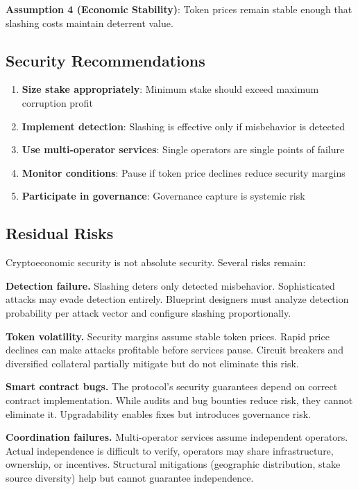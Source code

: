 \documentclass[11pt,a4paper]{article}
\begin{document}
\textbf{Assumption 4 (Economic Stability)}: Token prices remain stable enough that slashing costs maintain deterrent value.

\subsection{Security Recommendations}

\begin{enumerate}[noitemsep]
    \item \textbf{Size stake appropriately}: Minimum stake should exceed maximum corruption profit
    \item \textbf{Implement detection}: Slashing is effective only if misbehavior is detected
    \item \textbf{Use multi-operator services}: Single operators are single points of failure
    \item \textbf{Monitor conditions}: Pause if token price declines reduce security margins
    \item \textbf{Participate in governance}: Governance capture is systemic risk
\end{enumerate}

\subsection{Residual Risks}

Cryptoeconomic security is not absolute security. Several risks remain:

\textbf{Detection failure.} Slashing deters only detected misbehavior. Sophisticated attacks may evade detection entirely. Blueprint designers must analyze detection probability per attack vector and configure slashing proportionally.

\textbf{Token volatility.} Security margins assume stable token prices. Rapid price declines can make attacks profitable before services pause. Circuit breakers and diversified collateral partially mitigate but do not eliminate this risk.

\textbf{Smart contract bugs.} The protocol's security guarantees depend on correct contract implementation. While audits and bug bounties reduce risk, they cannot eliminate it. Upgradability enables fixes but introduces governance risk.

\textbf{Coordination failures.} Multi-operator services assume independent operators. Actual independence is difficult to verify, operators may share infrastructure, ownership, or incentives. Structural mitigations (geographic distribution, stake source diversity) help but cannot guarantee independence.
\end{document}
